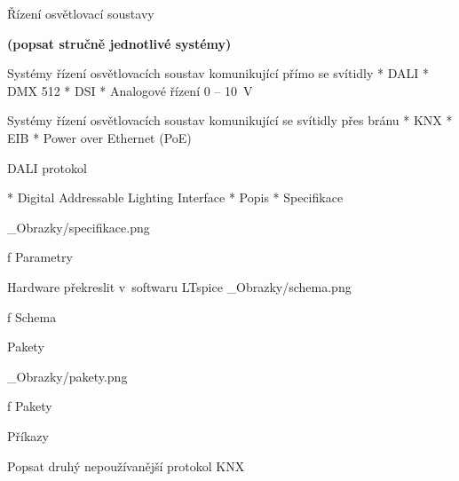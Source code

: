 \chap Řízení osvětlovací soustavy

{\bf (popsat stručně jednotlivé systémy)}

\medskip
Systémy řízení osvětlovacích soustav komunikující přímo se svítidly
\medskip
\begitems
    * DALI
    * DMX 512
    * DSI
    * Analogové řízení 0 -- 10~V
\enditems

\medskip
Systémy řízení osvětlovacích soustav komunikující se svítidly přes bránu
\begitems
    * KNX
    * EIB
    * Power over Ethernet (PoE)
\enditems

\sec DALI protokol


\begitems
    * Digital Addressable Lighting Interface
\medskip
    * Popis
\medskip
    * Specifikace
\enditems

\medskip {}
\picw=12cm _Obrazky/specifikace.png
\caption/f Parametry
\medskip

\secc Hardware překreslit v~softwaru LTspice
\medskip {}
\picw=15cm _Obrazky/schema.png
\caption/f Schema
\medskip

\secc Pakety

\medskip {}
\picw=15cm _Obrazky/pakety.png
\caption/f Pakety
\medskip

\secc Příkazy

\secc Popsat druhý nepoužívanější protokol KNX